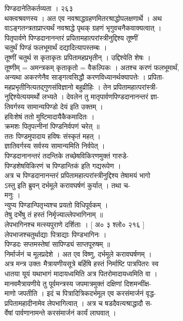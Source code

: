 \documentclass[11pt, openany]{book}
\begin{document}
{{{{{{{{{{{{{{{{{{{{{{{{{ }{ पिण्डदानेतिकर्तव्यता । २६३}{\\
थक्त्वश्रवणस्य । अत एव नवश्राद्धग्रहणमितरश्राद्धोपलक्षणार्थे । अथ\\
वाऽङ्गतन्त्रताप्राप्त्यर्थं नवश्राद्धे पृथक् ग्रहणं भृगुवचनैकवाक्यत्वात्
।\\
पितृपार्वणे पिण्डदानानन्तरं प्रपितामहात्परांस्त्रीनुद्दिश्य तूष्णीं\\
चतुर्थं पिण्डं फलभूमार्थं दद्यादित्यापस्तम्बः ।\\
तूष्णीं चतुर्थ स कृताकृतः प्रपितामहप्रभृतीन् । उद्दिश्येति शेषः ।\\
तूष्णीम् = अमन्त्रकम् कृताकृतो = वैकल्पिकः । अतश्च करणं फलभूमार्थं,\\
अन्यथा अकरणेनैव साङ्गत्वसिद्धौ करणविध्यानर्थक्यापत्तेः । प्रपिता-\\
महप्रभृतीनित्यतद्गुणसंविज्ञानो बहुव्रीहिः । तेन
प्रपितामहात्परांस्त्री-\\
नुद्दिश्येत्ययमर्थो लभ्यते । देवलेन तु मातृपार्वणपिण्डदानानन्तरं ज्ञा-\\
तिवर्गस्य सामान्यपिण्डो देयं इति उक्तम् ।\\
हविःशेषं ततो मुष्टिमादायैकैकमादितः ।\\
क्रमशः पितृपत्नीनां पिण्डनिर्वपणं चरेत् ॥\\
ततः पिण्डमुपादाय हविषः संस्कृतं महत् ।\\
ज्ञातिवर्गस्य सर्वस्य सामान्यमिति निर्वपेत् ।\\
पिण्डदानानन्तरं तदन्तिके तच्छेषविकिरणमुक्तं गारुडे-\\
पिण्डशेषविकिरणं च पिण्डान्तिकं इति गद्यरूपेण ।\\
अत्र च पिण्डदानानन्तरं प्रपितामहात्परांस्त्रीनुद्दिश्य तेषामयं भागो\\
ऽस्तु इति ब्रुवन् दर्भमूले करावघर्षणं कुर्यात् । तथा च-\\
मनुः ।\\
न्युप्य पिण्डान्पितृभ्यश्च प्रयतो विधिपूर्वकम् ।\\
तेषु दर्भेषु तं हस्तं निर्मृज्याल्लेपभागिनाम् }{॥}{\\
लेपभागिनश्च मत्स्यपुराणे दर्शिताः । {[} अ० ३ श्लो० २१६ {]}\\
लेपभाजश्चतुर्थाद्याः पित्राद्याः पिण्डभागिनः ।\\
पिण्डदः सप्तमस्तेषां सापिण्ड्यं साप्तपूरुषम् ॥\\
निर्मार्जनं च मूलप्रदेशे । अत एव विष्णु, दर्भमूले करावघर्षणम् ।\\
अत्र मन्त्र उक्तः मैत्रायणीयसूत्रे बर्हिषि हस्तं निर्माष्टि पात्रपितरः
स्व\\
धातया यूयं यथाभागं मादायध्वमिति अत्र पितरोमादायध्वमिति वा ।\\
मानवमैत्रायणीये तु पूर्वमन्त्रस्य जपमात्रमुक्तं दक्षिणां दिशमन्वींक्ष-\\
माणो जपतीति । इदं च पित्रादित्रिकदर्भमूल एव करसंमार्जनं वृद्ध-\\
प्रपितामहादीनामेव लेपभागित्वात् । अत्र च षडदैवत्यश्राद्धादौ स-\\
र्वेषां पार्वणानामन्ते करसंमार्जनं कार्यं लाघवात् ।\\


}}}}}}}}}}}}}}}}}}}}}}}}}
\end{document}
